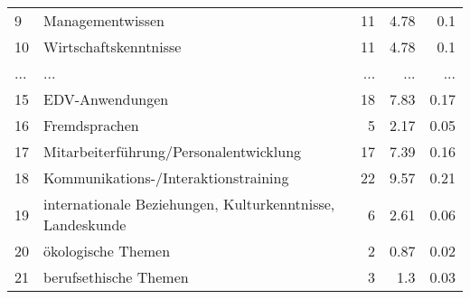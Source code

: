 \begin{longtable}{lXrrr}
        9 & \multicolumn{1}{X}{Managementwissen} & %
          \num{11} &
          \num[round-mode=places,round-precision=2]{4.78} &
          \num[round-mode=places,round-precision=2]{0.1} \\
        10 & \multicolumn{1}{X}{Wirtschaftskenntnisse} & %
          \num{11} &
          \num[round-mode=places,round-precision=2]{4.78} &
          \num[round-mode=places,round-precision=2]{0.1} \\
       ... & ... & ... & ... & ... \\
        15 & \multicolumn{1}{X}{EDV-Anwendungen} & %
          \num{18} &
          \num[round-mode=places,round-precision=2]{7.83} &
          \num[round-mode=places,round-precision=2]{0.17} \\

        16 & \multicolumn{1}{X}{Fremdsprachen} & %
          \num{5} &
          \num[round-mode=places,round-precision=2]{2.17} &
          \num[round-mode=places,round-precision=2]{0.05} \\

        17 & \multicolumn{1}{X}{Mitarbeiterführung/Personalentwicklung} & %
          \num{17} &
          \num[round-mode=places,round-precision=2]{7.39} &
          \num[round-mode=places,round-precision=2]{0.16} \\

        18 & \multicolumn{1}{X}{Kommunikations-/Interaktionstraining} & %
          \num{22} &
          \num[round-mode=places,round-precision=2]{9.57} &
          \num[round-mode=places,round-precision=2]{0.21} \\

        19 & \multicolumn{1}{X}{internationale Beziehungen, Kulturkenntnisse, Landeskunde} & %
          \num{6} &
          \num[round-mode=places,round-precision=2]{2.61} &
          \num[round-mode=places,round-precision=2]{0.06} \\

        20 & \multicolumn{1}{X}{ökologische Themen} & %
          \num{2} &
          \num[round-mode=places,round-precision=2]{0.87} &
          \num[round-mode=places,round-precision=2]{0.02} \\

        21 & \multicolumn{1}{X}{berufsethische Themen} & %
          \num{3} &
          \num[round-mode=places,round-precision=2]{1.3} &
          \num[round-mode=places,round-precision=2]{0.03} \\


\end{longtable}
